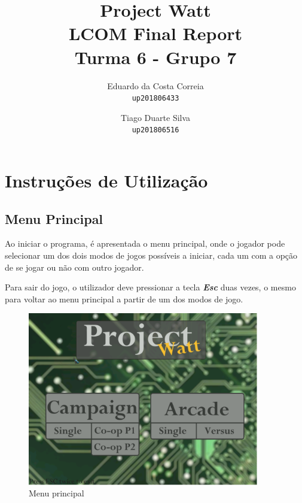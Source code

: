 \documentclass{report}
\begin{document}
\title{\textbf{Project Watt} \\ LCOM Final Report \\ Turma 6 - Grupo 7}
\author{Eduardo da Costa Correia\\
\texttt{up201806433}
\and
Tiago Duarte Silva\\
\texttt{up201806516}}   
\maketitle

\tableofcontents

\chapter{Instruções de Utilização} 

\section{Menu Principal}

Ao iniciar o programa, é apresentada o menu principal, onde o jogador pode selecionar um dos dois modos de jogos possíveis a iniciar, cada um com a opção de se jogar ou não com outro jogador.

Para sair do jogo, o utilizador deve pressionar a tecla \textbf{\textit{Esc}} duas vezes, o mesmo para voltar ao menu principal a partir de um dos modos de jogo.

\begin{figure}[H]
	\centering
	\includegraphics[width=0.9\textwidth]{main_menu}
	\caption{Menu principal}
\end{figure}

\pagebreak
\end{document}
